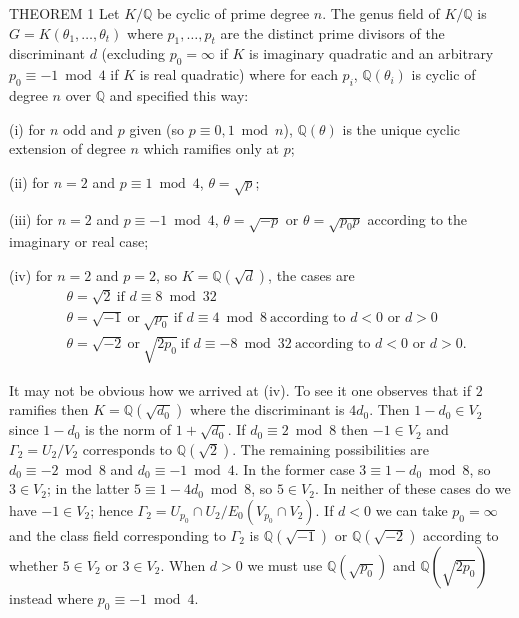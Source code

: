 \begin{namedstmt}{THEOREM 1}
Let $K/\mathbb{Q}$ be cyclic of prime degree $n$. The genus field of
$K/\mathbb{Q}$ is $G=K(\theta_{1},\ldots,\theta_{t})$ where
$p_{1},\ldots,p_{t}$ are the distinct prime divisors of the discriminant
$d$ (excluding $p_{0}=\infty$ if $K$ is imaginary quadratic and an
arbitrary $p_{0}\equiv -1\bmod 4$ if $K$ is real quadratic) where for
each $p_{i}$, $\mathbb{Q}(\theta_{i})$ is cyclic of degree $n$ over
$\mathbb{Q}$ and specified this way:

(i) for $n$ odd and $p$ given (so $p\equiv 0,1\bmod n$), $\mathbb{Q}
(\theta)$ is the unique cyclic extension of degree $n$ which ramifies
only at $p$;

(ii) for $n=2$ and $p\equiv 1\bmod 4$, $\theta=\sqrt{p}$;

(iii) for $n=2$ and $p\equiv -1\bmod 4$, $\theta=\sqrt{-p}$ or
$\theta=\sqrt{p_{0}p}$ according to the imaginary or real case;

(iv) for $n=2$ and $p=2$, so $K=\mathbb{Q}(\sqrt{d})$, the cases are
\[
\begin{aligned}
&\theta=\sqrt{2}\ \text{if } d\equiv 8\bmod 32\\
&\theta=\sqrt{-1}\ \text{or}\ \sqrt{p_{0}}\ \text{if } d\equiv 4\bmod 8
\ \text{according to } d<0 \text{ or } d>0\\
&\theta=\sqrt{-2}\ \text{or}\ \sqrt{2p_{0}}\ \text{if }
d\equiv -8\bmod 32\ \text{according to } d<0 \text{ or } d>0.
\end{aligned}
\]
\end{namedstmt}

It may not be obvious how we arrived at (iv). To see it one observes that
if $2$ ramifies then $K=\mathbb{Q}(\sqrt{d_{0}})$ where the discriminant
is $4d_{0}$. Then $1-d_{0}\in V_{2}$ since $1-d_{0}$ is the norm of
$1+\sqrt{d_{0}}$. If $d_{0}\equiv 2\bmod 8$ then $-1\in V_{2}$ and
$\Gamma_{2}=U_{2}/V_{2}$ corresponds to $\mathbb{Q}(\sqrt{2})$. The
remaining possibilities are $d_{0}\equiv -2\bmod 8$ and
$d_{0}\equiv -1\bmod 4$. In the former case $3\equiv 1-d_{0}\bmod 8$, so
$3\in V_{2}$; in the latter $5\equiv 1-4d_{0}\bmod 8$, so $5\in V_{2}$.
In neither of these cases do we have $-1\in V_{2}$; hence
$\Gamma_{2}=U_{p_{0}}\cap U_{2}/E_{0}(V_{p_{0}}\cap V_{2})$. If $d<0$ we
can take $p_{0}=\infty$ and the class field corresponding to $\Gamma_{2}$
is $\mathbb{Q}(\sqrt{-1})$ or $\mathbb{Q}(\sqrt{-2})$ according to
whether $5\in V_{2}$ or $3\in V_{2}$. When $d>0$ we must use
$\mathbb{Q}(\sqrt{p_{0}})$ and $\mathbb{Q}(\sqrt{2p_{0}})$ instead where
$p_{0}\equiv -1\bmod 4$.

